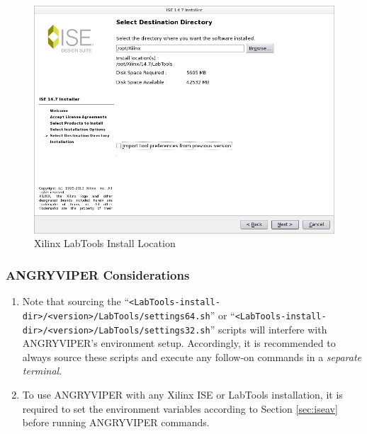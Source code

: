 \begin{flushleft}
\begin{flushleft}
\begin{enumerate}
\begin{figure}[H]
	\centerline{\includegraphics[scale=0.4]{figures/xilinx_labtools_install_location}}
	\caption{Xilinx LabTools Install Location}
\end{figure}
\end{enumerate}

\subsubsection{ANGRYVIPER Considerations}
\begin{enumerate}
\item Note that sourcing the ``\verb+<LabTools-install-dir>/<version>/LabTools/settings64.sh+'' or ``\verb+<LabTools-install-dir>/<version>/LabTools/settings32.sh+'' scripts will interfere with ANGRYVIPER's environment setup. Accordingly, it is recommended to always source these scripts and execute any follow-on commands in a \textit{separate terminal}.
\item To use ANGRYVIPER with any Xilinx ISE or LabTools installation, it is required to set the environment variables according to Section \ref{sec:iseav} before running ANGRYVIPER commands.
\end{enumerate}

\end{flushleft}
\pagebreak

\end{flushleft}

